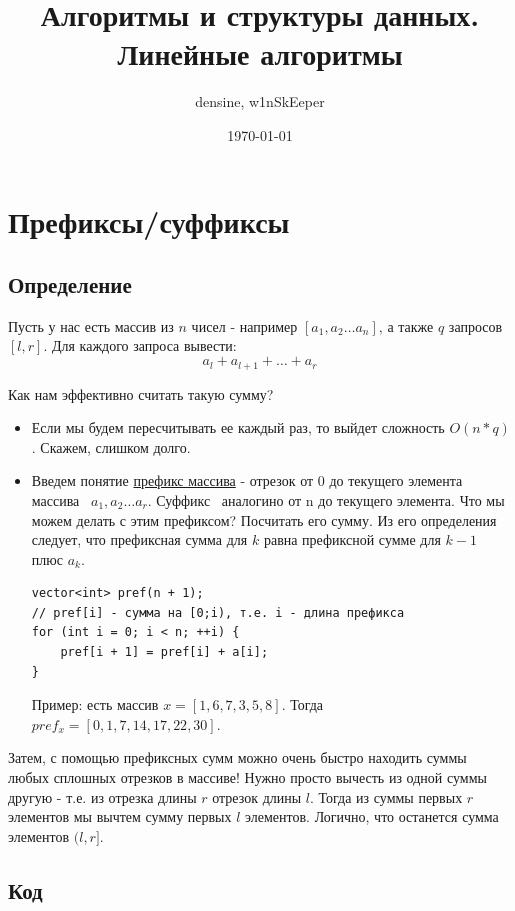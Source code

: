\documentclass[a4paper,12pt]{article}
\title{Алгоритмы и структуры данных. Линейные алгоритмы}
\author{densine, w1nSkEeper}
\date{\today}
\begin{document}
\maketitle
\tableofcontents

\section{Префиксы/суффиксы}

\subsection{Определение}

Пусть у нас есть массив из $n$ чисел - например $[a_1, a_2 \dots a_n]$, а также
$q$ запросов $[l, r]$. Для каждого запроса вывести:
\[
	a_l + a_{l+1} + \dots + a_r
\]

Как нам эффективно считать такую сумму?

\begin{itemize}
	\item Если мы будем пересчитывать ее каждый раз, то выйдет сложность $O(n * q)$.
	      Скажем, слишком долго.
	\item Введем понятие \uline{префикс массива} - отрезок от 0 до текущего элемента массива
	      \textendash\ $a_1, a_2 \dots a_r$. Суффикс \textendash\ аналогино от n до текущего элемента.
	      Что мы можем делать с этим префиксом? Посчитать его сумму.
	      Из его определения следует, что префиксная сумма для $k$ равна префиксной
	      сумме для $k - 1$ плюс $a_k$.
	      \begin{verbatim}
vector<int> pref(n + 1);
// pref[i] - сумма на [0;i), т.е. i - длина префикса
for (int i = 0; i < n; ++i) {
    pref[i + 1] = pref[i] + a[i];
}
          \end{verbatim}
	      Пример: есть массив $x = [1, 6, 7, 3, 5, 8]$.
	      Тогда $pref_x = [0, 1, 7, 14, 17, 22, 30]$.
\end{itemize}

Затем, с помощью префиксных сумм можно очень быстро находить суммы любых
сплошных отрезков в массиве! Нужно просто вычесть из одной суммы другую
- т.е. из отрезка длины $r$ отрезок длины $l$. Тогда из суммы первых
$r$ элементов мы вычтем сумму первых $l$ элементов. Логично, что
останется сумма элементов $(l, r]$.

\subsection{Код}
\end{document}
